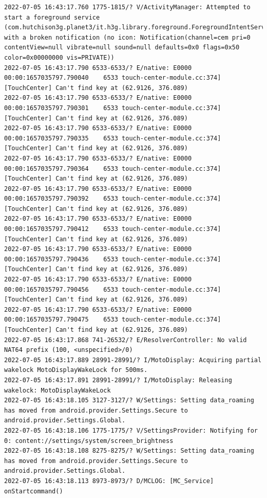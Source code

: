 \documentclass[a4paper,12pt]{book}
\begin{document}
\begin{lstlisting}
2022-07-05 16:43:17.760 1775-1815/? V/ActivityManager: Attempted to start a foreground service (com.hutchison3g.planet3/it.h3g.library.foreground.ForegroundIntentService) with a broken notification (no icon: Notification(channel=cem pri=0 contentView=null vibrate=null sound=null defaults=0x0 flags=0x50 color=0x00000000 vis=PRIVATE))
2022-07-05 16:43:17.790 6533-6533/? E/native: E0000 00:00:1657035797.790040    6533 touch-center-module.cc:374] [TouchCenter] Can't find key at (62.9126, 376.089)
2022-07-05 16:43:17.790 6533-6533/? E/native: E0000 00:00:1657035797.790301    6533 touch-center-module.cc:374] [TouchCenter] Can't find key at (62.9126, 376.089)
2022-07-05 16:43:17.790 6533-6533/? E/native: E0000 00:00:1657035797.790335    6533 touch-center-module.cc:374] [TouchCenter] Can't find key at (62.9126, 376.089)
2022-07-05 16:43:17.790 6533-6533/? E/native: E0000 00:00:1657035797.790364    6533 touch-center-module.cc:374] [TouchCenter] Can't find key at (62.9126, 376.089)
2022-07-05 16:43:17.790 6533-6533/? E/native: E0000 00:00:1657035797.790392    6533 touch-center-module.cc:374] [TouchCenter] Can't find key at (62.9126, 376.089)
2022-07-05 16:43:17.790 6533-6533/? E/native: E0000 00:00:1657035797.790412    6533 touch-center-module.cc:374] [TouchCenter] Can't find key at (62.9126, 376.089)
2022-07-05 16:43:17.790 6533-6533/? E/native: E0000 00:00:1657035797.790436    6533 touch-center-module.cc:374] [TouchCenter] Can't find key at (62.9126, 376.089)
2022-07-05 16:43:17.790 6533-6533/? E/native: E0000 00:00:1657035797.790456    6533 touch-center-module.cc:374] [TouchCenter] Can't find key at (62.9126, 376.089)
2022-07-05 16:43:17.790 6533-6533/? E/native: E0000 00:00:1657035797.790475    6533 touch-center-module.cc:374] [TouchCenter] Can't find key at (62.9126, 376.089)
2022-07-05 16:43:17.868 741-26532/? E/ResolverController: No valid NAT64 prefix (100, <unspecified>/0)
2022-07-05 16:43:17.889 28991-28991/? I/MotoDisplay: Acquiring partial wakelock MotoDisplayWakeLock for 500ms.
2022-07-05 16:43:17.891 28991-28991/? I/MotoDisplay: Releasing wakelock: MotoDisplayWakeLock
2022-07-05 16:43:18.105 3127-3127/? W/Settings: Setting data_roaming has moved from android.provider.Settings.Secure to android.provider.Settings.Global.
2022-07-05 16:43:18.106 1775-1775/? V/SettingsProvider: Notifying for 0: content://settings/system/screen_brightness
2022-07-05 16:43:18.108 8275-8275/? W/Settings: Setting data_roaming has moved from android.provider.Settings.Secure to android.provider.Settings.Global.
2022-07-05 16:43:18.113 8973-8973/? D/MCLOG: [MC_Service] onStartcommand()

\end{lstlisting}
\end{document}
